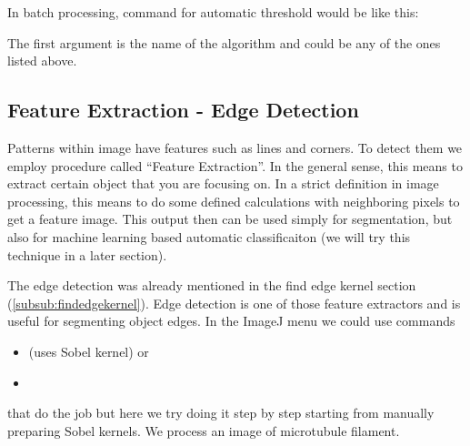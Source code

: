 In batch processing, command for automatic threshold would be like this:


The first argument is the name of the algorithm and could be any of the
ones listed above.
 
\subsection{Feature Extraction - Edge Detection}

Patterns within image have features such as lines and corners. To detect them we employ procedure called ``Feature Extraction''. In the general sense, this means to extract certain object that you are focusing on. In a strict definition in image processing, this means to do some defined calculations with neighboring pixels to get a feature image. This output then can be used simply for segmentation, but also for machine learning based automatic classificaiton (we will try this technique in a later section). 

The edge detection was already mentioned in the find edge kernel section (\ref{subsub:findedgekernel}). Edge detection is one of those feature extractors and is useful for segmenting object edges. 
In the ImageJ menu we could use commands 
\begin{itemize}
\item {} (uses Sobel kernel) or 
\item {} 
\end{itemize}
that do the job but here we try doing it step by step starting from manually preparing Sobel kernels. We process an image of microtubule filament. 

